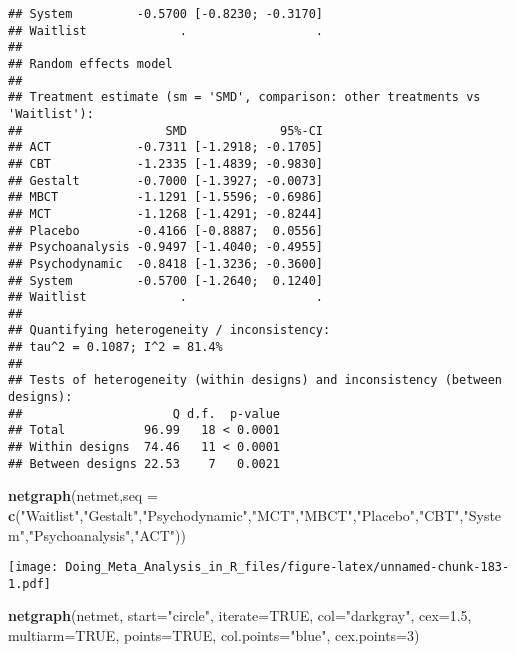\documentclass[]{book}
\newenvironment{Shaded}{\begin{snugshade}}{\end{snugshade}}
\newcommand{\KeywordTok}[1]{\textcolor[rgb]{0.13,0.29,0.53}{\textbf{#1}}}
\newcommand{\DataTypeTok}[1]{\textcolor[rgb]{0.13,0.29,0.53}{#1}}
\newcommand{\DecValTok}[1]{\textcolor[rgb]{0.00,0.00,0.81}{#1}}
\newcommand{\FloatTok}[1]{\textcolor[rgb]{0.00,0.00,0.81}{#1}}
\newcommand{\StringTok}[1]{\textcolor[rgb]{0.31,0.60,0.02}{#1}}
\newcommand{\OtherTok}[1]{\textcolor[rgb]{0.56,0.35,0.01}{#1}}
\newcommand{\NormalTok}[1]{#1}
\theoremstyle{definition}
\theoremstyle{definition}
\theoremstyle{definition}
\theoremstyle{remark}
\begin{document}
\begin{verbatim}
## System         -0.5700 [-0.8230; -0.3170]
## Waitlist             .                  .
## 
## Random effects model
## 
## Treatment estimate (sm = 'SMD', comparison: other treatments vs 'Waitlist'):
##                    SMD             95%-CI
## ACT            -0.7311 [-1.2918; -0.1705]
## CBT            -1.2335 [-1.4839; -0.9830]
## Gestalt        -0.7000 [-1.3927; -0.0073]
## MBCT           -1.1291 [-1.5596; -0.6986]
## MCT            -1.1268 [-1.4291; -0.8244]
## Placebo        -0.4166 [-0.8887;  0.0556]
## Psychoanalysis -0.9497 [-1.4040; -0.4955]
## Psychodynamic  -0.8418 [-1.3236; -0.3600]
## System         -0.5700 [-1.2640;  0.1240]
## Waitlist             .                  .
## 
## Quantifying heterogeneity / inconsistency:
## tau^2 = 0.1087; I^2 = 81.4%
## 
## Tests of heterogeneity (within designs) and inconsistency (between designs):
##                     Q d.f.  p-value
## Total           96.99   18 < 0.0001
## Within designs  74.46   11 < 0.0001
## Between designs 22.53    7   0.0021
\end{verbatim}

\begin{Shaded}
\begin{Highlighting}[]
\KeywordTok{netgraph}\NormalTok{(netmet,}\DataTypeTok{seq =} \KeywordTok{c}\NormalTok{(}\StringTok{"Waitlist"}\NormalTok{,}\StringTok{"Gestalt"}\NormalTok{,}\StringTok{"Psychodynamic"}\NormalTok{,}\StringTok{"MCT"}\NormalTok{,}\StringTok{"MBCT"}\NormalTok{,}\StringTok{"Placebo"}\NormalTok{,}\StringTok{"CBT"}\NormalTok{,}\StringTok{"System"}\NormalTok{,}\StringTok{"Psychoanalysis"}\NormalTok{,}\StringTok{"ACT"}\NormalTok{))}
\end{Highlighting}
\end{Shaded}

\texttt{[image: Doing\_Meta\_Analysis\_in\_R\_files/figure-latex/unnamed-chunk-183-1.pdf]}

\begin{Shaded}
\begin{Highlighting}[]
\KeywordTok{netgraph}\NormalTok{(netmet, }\DataTypeTok{start=}\StringTok{"circle"}\NormalTok{, }\DataTypeTok{iterate=}\OtherTok{TRUE}\NormalTok{, }\DataTypeTok{col=}\StringTok{"darkgray"}\NormalTok{, }\DataTypeTok{cex=}\FloatTok{1.5}\NormalTok{, }\DataTypeTok{multiarm=}\OtherTok{TRUE}\NormalTok{, }\DataTypeTok{points=}\OtherTok{TRUE}\NormalTok{, }\DataTypeTok{col.points=}\StringTok{"blue"}\NormalTok{, }\DataTypeTok{cex.points=}\DecValTok{3}\NormalTok{)}
\end{Highlighting}
\end{Shaded}
\end{document}
